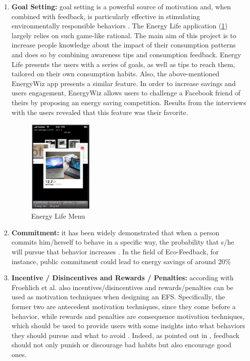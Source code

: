 \begin{enumerate}
\begin{itemize}
    \end{itemize}

\item \textbf{Goal Setting:}
goal setting is a powerful source of motivation and, when combined with feedback, is particularly effective in stimulating environmentally responsible behaviors \cite{Froehlich2010}. The Energy Life application \cite{Giulio2009}(\cref{fig:energylife}) largely relies on such game-like rational. The main aim of this project is to increase people knowledge about the impact of their consumption patterns and does so by combining awareness tips and consumption feedback. Energy Life presents the users with a series of goals, as well as tips to reach them, tailored on their own consumption habits. Also, the above-mentioned EnergyWiz app \cite{Petkov2011} presents a similar feature. In order to increase savings and users engagement, EnergyWiz allows users to challenge a Facebook friend of theirs by proposing an energy saving competition. Results from the interviews with the users revealed that this feature was their favorite. 

\begin{figure}[h]
\centering
\includegraphics[width=0.3\textwidth]{./Images/energylife}
\caption{Energy Life Menu}
\label{fig:energylife}
\end{figure}

\item \textbf{Commitment:}
it has been widely demonstrated that when a person commits him/herself to behave in a specific way, the probability that s/he will pursue that behavior increases \cite{Froehlich2010}. In the field of Eco-Feedback, for instance, public commitment could lead to energy savings of around 20\% \cite{CommitmentandVoluntaryEnergyConservation}

\item \textbf{Incentive / Disincentives and Rewards / Penalties:}
according with Froehlich et al. \cite{Froehlich2010} also incentives/disincentives and rewards/penalties can be used as motivation techniques when designing an \ac{EFS}. Specifically, the former two are antecedent motivation techniques, since they come before a behavior, while rewards and penalties are consequence motivation techniques, which should be used to provide users with some insights into what behaviors they should pursue and what to avoid \cite{Froehlich2010}. Indeed, as pointed out in \cite{Giulio2009}, feedback should not only punish or discourage bad habits but also encourage good ones.


\end{enumerate}
